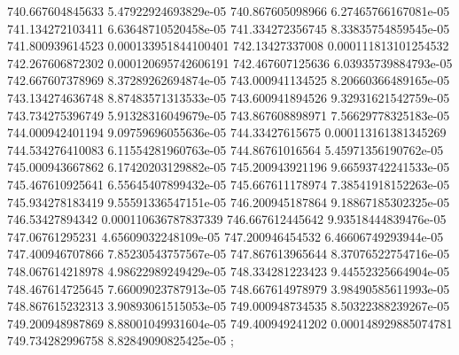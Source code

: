 {740.667604845633 5.47922924693829e-05
740.867605098966 6.27465766167081e-05
741.134272103411 6.63648710520458e-05
741.334272356745 8.33835754859545e-05
741.800939614523 0.000133951844100401
742.13427337008 0.000111813101254532
742.267606872302 0.000120695742606191
742.467607125636 6.03935739884793e-05
742.667607378969 8.37289262694874e-05
743.000941134525 8.20660366489165e-05
743.134274636748 8.87483571313533e-05
743.600941894526 9.32931621542759e-05
743.734275396749 5.91328316049679e-05
743.867608898971 7.56629778325183e-05
744.000942401194 9.09759696055636e-05
744.33427615675 0.000113161381345269
744.534276410083 6.11554281960763e-05
744.86761016564 5.45971356190762e-05
745.000943667862 6.17420203129882e-05
745.200943921196 9.66593742241533e-05
745.467610925641 6.55645407899432e-05
745.667611178974 7.38541918152263e-05
745.934278183419 9.55591336547151e-05
746.200945187864 9.18867185302325e-05
746.53427894342 0.000110636787837339
746.667612445642 9.93518444839476e-05
747.06761295231 4.65609032248109e-05
747.200946454532 6.46606749293944e-05
747.400946707866 7.85230543757567e-05
747.867613965644 8.37076522754716e-05
748.067614218978 4.98622989249429e-05
748.334281223423 9.44552325664904e-05
748.467614725645 7.66009023787913e-05
748.667614978979 3.98490585611993e-05
748.867615232313 3.90893061515053e-05
749.000948734535 8.50322388239267e-05
749.200948987869 8.88001049931604e-05
749.400949241202 0.000148929885074781
749.734282996758 8.82849090825425e-05
};